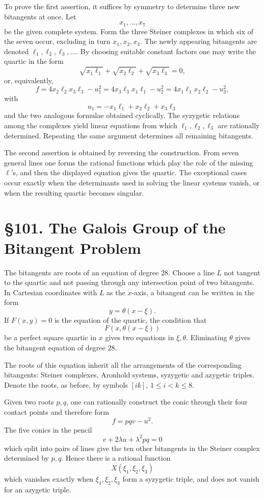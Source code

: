 \documentclass[11pt,a4paper]{book}
\newcommand{\webersection}[2]{\clearpage\section*{\S #1. #2}}
\begin{document}
To prove the first assertion, it suffices by symmetry to determine three new bitangents at once.  Let
\[
x_1,\ldots,x_7
\]
be the given complete system.  Form the three Steiner complexes in which six of the seven occur, excluding in turn \(x_1,x_2,x_3\).  The newly appearing bitangents are denoted \(\ell_1,\ell_2,\ell_3,\ldots\).  By choosing suitable constant factors one may write the quartic in the form
\[
\sqrt{x_1\ell_1}+\sqrt{x_2\ell_2}+\sqrt{x_3\ell_3}=0,
\]
or, equivalently,
\[
f=4x_2\ell_2x_3\ell_3-u_1^2
 =4x_3\ell_3x_1\ell_1-u_2^2
 =4x_1\ell_1x_2\ell_2-u_3^2,
\]
with
\[
u_1=-x_1\ell_1+x_2\ell_2+x_3\ell_3
\]
and the two analogous formulae obtained cyclically.  The syzygetic relations among the complexes yield linear equations from which \(\ell_1,\ell_2,\ell_3\) are rationally determined.  Repeating the same argument determines all remaining bitangents.

The second assertion is obtained by reversing the construction.  From seven general lines one forms the rational functions which play the role of the missing \(\ell\)'s, and then the displayed equation gives the quartic.  The exceptional cases occur exactly when the determinants used in solving the linear systems vanish, or when the resulting quartic becomes singular.

\webersection{101}{The Galois Group of the Bitangent Problem}

The bitangents are roots of an equation of degree \(28\).  Choose a line \(L\) not tangent to the quartic and not passing through any intersection point of two bitangents.  In Cartesian coordinates with \(L\) as the \(x\)-axis, a bitangent can be written in the form
\[
y=\theta(x-\xi).
\]
If \(F(x,y)=0\) is the equation of the quartic, the condition that
\[
F(x,\theta(x-\xi))
\]
be a perfect square quartic in \(x\) gives two equations in \(\xi,\theta\).  Eliminating \(\theta\) gives the bitangent equation of degree \(28\).

The roots of this equation inherit all the arrangements of the corresponding bitangents: Steiner complexes, Aronhold systems, syzygetic and azygetic triples.  Denote the roots, as before, by symbols \([ik]\), \(1\le i<k\le8\).

Given two roots \(p,q\), one can rationally construct the conic through their four contact points and therefore form
\[
f=pqv-u^2.
\]
The five conics in the pencil
\[
v+2\lambda u+\lambda^2pq=0
\]
which split into pairs of lines give the ten other bitangents in the Steiner complex determined by \(p,q\).  Hence there is a rational function
\[
X(\xi_1,\xi_2,\xi_3)
\]
which vanishes exactly when \(\xi_1,\xi_2,\xi_3\) form a syzygetic triple, and does not vanish for an azygetic triple.
\end{document}

